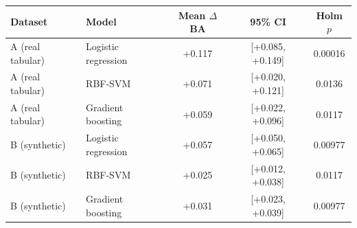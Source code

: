 \begin{tabular}{llccc}\toprule
Dataset & Model & Mean $\Delta$BA & 95\% CI & Holm $p$\\\midrule
A (real tabular) & Logistic regression & +0.117 & [+0.085, +0.149] & 0.00016\\
A (real tabular) & RBF-SVM & +0.071 & [+0.020, +0.121] & 0.0136\\
A (real tabular) & Gradient boosting & +0.059 & [+0.022, +0.096] & 0.0117\\
B (synthetic) & Logistic regression & +0.057 & [+0.050, +0.065] & 0.00977\\
B (synthetic) & RBF-SVM & +0.025 & [+0.012, +0.038] & 0.0117\\
B (synthetic) & Gradient boosting & +0.031 & [+0.023, +0.039] & 0.00977\\
\bottomrule\end{tabular}